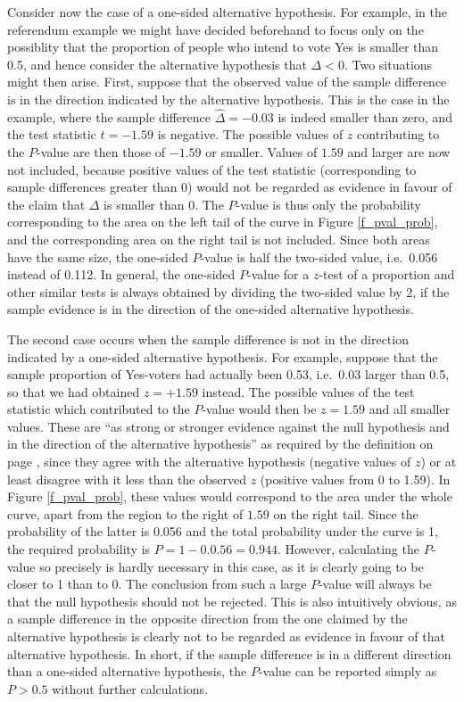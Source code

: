 \label{p_onesided}
Consider now the case of a one-sided alternative hypothesis. For
example, in the referendum example we might have decided beforehand to
focus only on the possiblity that the proportion of people who intend to
vote Yes is smaller than 0.5, and hence consider the alternative
hypothesis that $\Delta<0$. Two situations might then arise. First,
suppose that the observed value of the sample difference is in the
direction indicated by the alternative hypothesis. This is the case in
the example, where the sample difference $\hat{\Delta}=-0.03$ is indeed
smaller than zero, and the test statistic $t=-1.59$ is negative. The
possible values of $z$ contributing to the $P$-value are then those of
$-1.59$ or smaller. Values of $1.59$ and larger are now not included,
because positive values of the test statistic (corresponding to sample
differences greater than 0) would not be regarded as evidence in favour
of the claim that $\Delta$ is smaller than 0. The $P$-value is thus only
the probability corresponding to the area on the left tail  of the curve
in Figure \ref{f_pval_prob}, and the corresponding area on the right
tail is not included. Since both areas have the same size, the one-sided
$P$-value is half the two-sided value, i.e.\ 0.056 instead of 0.112. In
general, the one-sided $P$-value for a $z$-test of a proportion and
other similar tests is always obtained by dividing the two-sided value
by 2, if the sample evidence is in the direction of the one-sided
alternative hypothesis.

The second case occurs when the sample difference is not in the
direction indicated by a one-sided alternative hypothesis. For example,
suppose that the sample proportion of Yes-voters had actually been 0.53,
i.e.\ 0.03 larger than 0.5, so that we had obtained $z=+1.59$ instead.
The possible values of the test statistic which contributed to the
$P$-value would then be $z=1.59$ and all smaller values. These are ``as
strong or stronger evidence against the null hypothesis and in the
direction of the alternative hypothesis'' as required by the definition
on page \pageref{p_pval_ref}, since they agree with the alternative
hypothesis (negative values of $z$) or at least disagree with it less
than the observed $z$ (positive values from 0 to 1.59). In Figure
\ref{f_pval_prob}, these values would correspond to the area under the
whole curve, apart from the region to the right of $1.59$ on the right
tail. Since the probability of the latter is 0.056 and the total
probability under the curve is 1, the required probability is
$P=1-0.0.56=0.944$. However, calculating the $P$-value so precisely is
hardly necessary in this case, as it is clearly going to be closer to 1
than to 0. The conclusion from such a large $P$-value will always be
that the null hypothesis should not be rejected. This is also
intuitively obvious, as a sample difference in the opposite direction
from the one claimed by the alternative hypothesis is clearly not to be
regarded as evidence in favour of that alternative hypothesis. In short,
if the sample difference is in a different direction than a one-sided
alternative hypothesis, the $P$-value can be reported simply as $P>0.5$
without further calculations.

